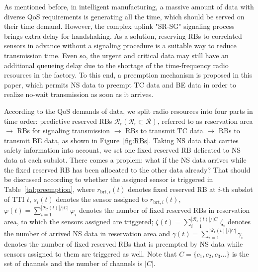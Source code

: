 \documentclass{SCIS2021}
\begin{document}
	\par As mentioned before, in intelligent manufacturing, a massive amount of data with diverse QoS requirements is generating all the time, which should be served on their time demand. However, the complex uplink "SR-SG" signaling process brings extra delay for handshaking. As a solution, reserving RBs to correlated sensors in advance without a signaling procedure is a suitable way to reduce transmission time. {\color{black} Even so, the urgent and critical data may still have an additional queueing delay due to the shortage of the time-frequency radio resources in the factory. To this end, a preemption mechanism is proposed in this paper, which permits NS data to preempt TC data and BE data in order to realize no-wait transmission as soon as it arrives.}



	\par {\color{black}According to the QoS demands of data, we split radio resources into four parts in time order: predictive reserved RBs $\mathcal{R}_{\text{r}} \left(\mathcal{R}_{\text {r}} \subset \mathcal{R}\right)$, referred to as reservation area $ \to$ RBs for signaling transmission $\to$ RBs to transmit TC data $\to$ RBs to transmit BE data, as shown in Figure~\ref{fig:RBs}. Taking NS data that carries safety information into account, we set one fixed reserved RB delicated to NS data at each subslot. }%
	There comes a proplem: what if the NS data arrives while the fixed reserved RB has been allocated to the other data already? {\color{black}That should be discussed according to whether the assigned sensor is triggered in Table~\ref{tal:preemption}, where $r_{\text{brt},i}(t)$ denotes fixed reserved RB at $i$-th subslot of TTI $t$, $s_{i}(t)$ denotes the sensor assigned to $r_{\text{brt},i}(t)$, $\varphi(t)=\sum_{i=1}^{\left|\mathcal{R}_{\mathbf{r}}(t)\right| / \left|C\right|} \varphi_{i}$ denotes the number of fixed reserved RBs in reservation area, to which the sensors assigned are triggered;  $\zeta(t)=\sum_{i=1}^{\left|\mathcal{R}_{\mathbf{r}}(t)\right| / \left|C\right|} \zeta_{i}$ denotes the number of arrived NS data in reservation area and $\gamma(t)=\sum_{i=1}^{\left|\mathcal{R}_{\mathbf{r}}(t)\right| / \left|C\right|} \gamma_{i}$ denotes the number of fixed reserved RBs that is preempted by NS data while sensors assigned to them are triggered as well. Note that $C = \{c_{1},c_{2},c_{3}...\}$ is the set of channels and the number of channels is $|C|$.}
\end{document}
